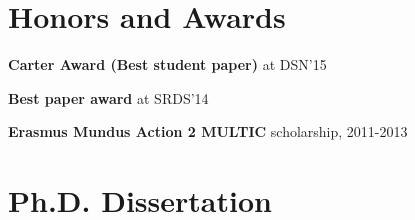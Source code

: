 \documentclass[letterpaper]{article}
\renewenvironment{itemize}{
  \begin{list}{}{
    \setlength{\leftmargin}{1.5em}
  }
}{
  \end{list}
}
\begin{document}
\section*{Honors and Awards}

\begin{itemize}
\item \textbf{Carter Award (Best student paper)} at DSN'15
\item \textbf{Best paper award} at SRDS'14
\item \textbf{Erasmus Mundus Action 2 MULTIC} scholarship, 2011-2013

\end{itemize}


\section* {Ph.D. Dissertation}
\end{document}

